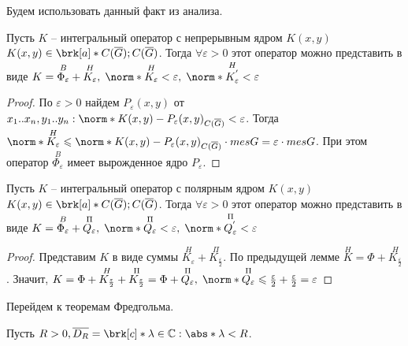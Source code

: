 Будем использовать данный факт из анализа.

\begin{lemma}
  Пусть $K$ -- интегральный оператор с непрерывным ядром $K(x,y)$ $K(x,y) \in \brk[a]*{C(\overline{G});C(\overline{G})}$. Тогда $\forall \varepsilon > 0$ этот оператор можно представить в виде $K = \overset{B}{\Phi_{\varepsilon}} + \overset{H}{K_{\varepsilon}}, \; \norm*{\overset{H}{K_{\varepsilon}}} < \varepsilon, \; \norm*{\overset{H}{K_{\varepsilon}^{'}}} < \varepsilon$
\end{lemma}
\begin{proof}
  По $\varepsilon > 0$ найдем $P_{\varepsilon}(x,y)$ от $x_{1}..x_{n},y_{1}..y_{n} : \norm*{K(x,y) - P_{\varepsilon}(x,y)}_{C(\overline{G})} < \varepsilon$. Тогда $\norm*{\overset{H}{K_{\varepsilon}}} \leq \norm*{K(x,y) - P_{\varepsilon}(x,y)}_{C(\overline{G})}\cdot mes G = \varepsilon\cdot mes G$. При этом оператор $\overset{B}{\Phi_{\varepsilon}}$ имеет вырожденное ядро $P_{\varepsilon}$.
\end{proof}

\begin{lemma}
  Пусть $K$ -- интегральный оператор с полярным ядром $K(x,y)$ $K(x,y) \in \brk[a]*{C(\overline{G});C(\overline{G})}$. Тогда $\forall \varepsilon > 0$ этот оператор можно представить в виде $K = \overset{B}{\Phi_{\varepsilon}} + \overset{\Pi}{Q_{\varepsilon}}, \; \norm*{\overset{\Pi}{Q_{\varepsilon}}} < \varepsilon, \; \norm*{\overset{\Pi}{Q_{\varepsilon}^{'}}} < \varepsilon$
\end{lemma}
\begin{proof}
Представим $K$ в виде суммы $\overset{H}{K_{\varepsilon}} + \overset{\Pi}{K_{\frac{\varepsilon}{2}}}$. По предыдущей лемме $\overset{H}{K} = \Phi+ \overset{H}{K_{\frac{\varepsilon}{2}}}$. Значит, $K = \Phi+ \overset{H}{K_{\frac{\varepsilon}{2}}} + \overset{\Pi}{K_{\frac{\varepsilon}{2}}} = \Phi + \overset{\Pi}{Q_{\varepsilon}}, \; \norm*{\overset{\Pi}{Q_{\varepsilon}}} \leq \frac{\varepsilon}{2} + \frac{\varepsilon}{2} = \varepsilon$
\end{proof}

Перейдем к теоремам Фредгольма.

Пусть $R > 0, \overline{D_{R}} = \brk[c]*{\lambda \in \C: \abs*{\lambda} < R}$.

